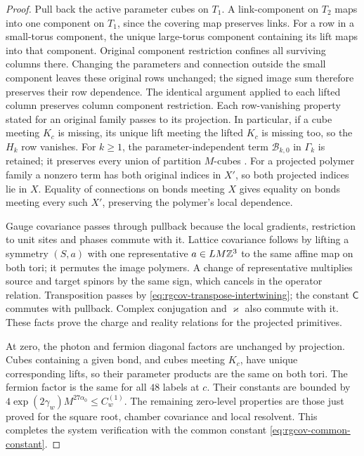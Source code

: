 \begin{proof}
Pull back the active parameter cubes on $T_1$.
A link-component on $T_2$ maps into one component
on $T_1$, since the covering map preserves links.
For a row in a small-torus component, the unique
large-torus component containing its lift maps into
that component. Original component restriction
confines all surviving columns there.
Changing the parameters and connection outside the
small component leaves these original rows unchanged;
the signed image sum therefore preserves their row
dependence. The identical argument applied to each
lifted column preserves column component restriction.
Each row-vanishing property stated for an original family passes
to its projection. In particular, if a cube meeting $K_c$ is
missing, its unique lift meeting the lifted $K_c$ is missing
too, so the $H_k$ row vanishes. For $k\ge1$, the
parameter-independent term $\mathcal B_{k,0}$ in $\Gamma_k$
is retained; it preserves every union of partition $M$-cubes
\cite[Proposition~4.3 and its proof]{FermionBlockManuscript}.
For a projected polymer family a nonzero term has
both original indices in $X'$, so both projected
indices lie in $X$. Equality of connections on bonds
meeting $X$ gives equality on bonds meeting every
such $X'$, preserving the polymer's local dependence.

Gauge covariance passes through pullback because
the local gradients, restriction to unit sites and
phases commute with it. Lattice covariance follows
by lifting a symmetry $(S,a)$ with one representative
$a\in LM\mathbb Z^3$ to the same affine map on both tori;
it permutes the image polymers. A change of representative
multiplies source and target spinors by the same sign,
which cancels in the operator relation.
Transposition passes by
\eqref{eq:rgcov-transpose-intertwining};
the constant $\mathsf C$ commutes with pullback.
Complex conjugation and $\varkappa$ also commute
with it. These facts prove the charge and reality
relations for the projected primitives.

At zero, the photon and fermion diagonal factors
are unchanged by projection. Cubes containing a
given bond, and cubes meeting $K_c$, have unique
corresponding lifts, so their parameter products
are the same on both tori. The fermion factor is
the same for all $48$ labels at $c$.
Their constants are bounded by
$4\exp(2\gamma_w)M^{27\alpha_0}\le C_w^{(1)}$.
The remaining zero-level properties are those
just proved for the square root, chamber covariance
and local resolvent. This completes the system
verification with the common constant
\eqref{eq:rgcov-common-constant}.
\end{proof}

